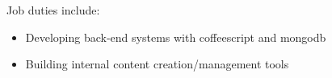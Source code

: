 \normalsize
Job duties include:
\small
\begin{itemize}
    \item Developing back-end systems with coffeescript and mongodb
    \item Building internal content creation/management tools
\end{itemize}
\normalsize
\medskip
